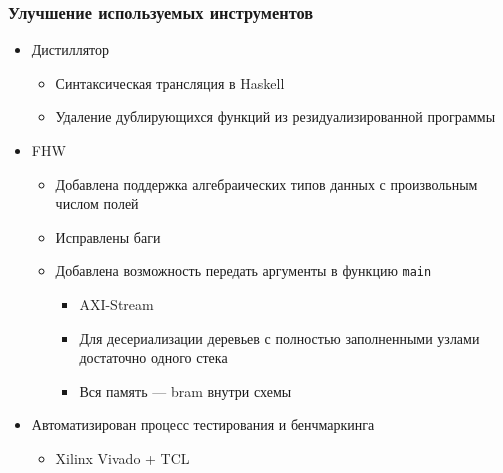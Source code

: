 \documentclass[xcolor=table,aspectratio=169]{beamer}
\begin{document}

      

\begin{frame}[fragile] \frametitle{Улучшение используемых инструментов}
  \begin{itemize}
  \item Дистиллятор
    \begin{itemize}
        \item Синтаксическая трансляция в Haskell
        \vfill
        \item Удаление дублирующихся функций из резидуализированной программы
        \vfill
    \end{itemize}
    \item FHW
        \begin{itemize}
            \item Добавлена поддержка алгебраических типов данных с произвольным числом полей
            \vfill
            \item Исправлены баги
            \vfill
            \item Добавлена возможность передать аргументы в функцию \texttt{main}
            \vfill
            \begin{itemize}
                \item AXI-Stream
                \vfill
                \item Для десериализации деревьев с полностью заполненными узлами достаточно одного стека
                \vfill
                \item Вся память --- bram внутри схемы
            \end{itemize}
        \end{itemize}
      \vfill
      \item Автоматизирован процесс тестирования и бенчмаркинга
      \vfill
      \begin{itemize}
          \item Xilinx Vivado + TCL
      \end{itemize}
  \end{itemize}
\end{frame}
\end{document}
